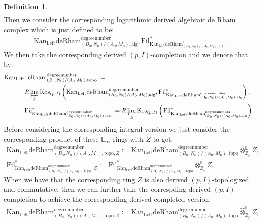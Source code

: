 \documentclass[11pt]{book}
\theoremstyle{definition}
\newtheorem{definition}[theorem]{Definition}
\numberwithin{equation}{section}
\begin{document}
\begin{definition}
\begin{align}
\end{align}
Then we consider the corresponding logarithmic derived algebraic de Rham complex which is just defined to be:
\begin{align}
\mathrm{Kan}_\mathrm{Left}\mathrm{deRham}^\text{degreenumber}_{(B_0,N_0)/(A_0,M_0),\mathrm{alg}},\mathrm{Fil}^*_{\mathrm{Kan}_\mathrm{Left}\mathrm{deRham}^1_{(B_0,N_0)/(A_0,M_0),\mathrm{alg}}}.	
\end{align}
We then take the corresponding derived $(p,I)$-completion and we denote that by:
\begin{align}
\mathrm{Kan}_\mathrm{Left}&\mathrm{deRham}^\text{degreenumber}_{(B_0,N_0)/(A_0,M_0),\mathrm{topo}}:=\\
&R\varprojlim_k\mathrm{Kos}_{(p,I)}\left(\mathrm{Kan}_\mathrm{Left}\mathrm{deRham}^\text{degreenumber}_{(B_0,N_0)/(A_0,M_0),\mathrm{alg}},\mathrm{Fil}^*_{\mathrm{Kan}_\mathrm{Left}\mathrm{deRham}^\text{degreenumber}_{(B_0,N_0)/(A_0,M_0),\mathrm{alg}}}\right),\\
&\mathrm{Fil}^*_{\mathrm{Kan}_\mathrm{Left}\mathrm{deRham}^\text{degreenumber}_{(B_0,N_0)/(A_0,M_0),\mathrm{topo}}}:=R\varprojlim_k\mathrm{Kos}_{(p,I)}\left(\mathrm{Fil}^*_{\mathrm{Kan}_\mathrm{Left}\mathrm{deRham}^\text{degreenumber}_{(B_0,N_0)/(A_0,M_0),\mathrm{alg}}}\right).	
\end{align}
Before considering the corresponding integral version we just consider the corresponding product of these $\mathbb{E}_\infty$-rings with $Z$ to get:
\begin{align}
\mathrm{Kan}_\mathrm{Left}\mathrm{deRham}^\text{degreenumber}_{(B_0,N_0)/(A_0,M_0),\mathrm{topo},Z}:=\mathrm{Kan}_\mathrm{Left}\mathrm{deRham}^\text{degreenumber}_{(B_0,N_0)/(A_0,M_0),\mathrm{topo}}{\otimes}^\mathbb{L}_{\mathbb{Z}_p}Z,\\
\mathrm{Fil}^*_{\mathrm{Kan}_\mathrm{Left}\mathrm{deRham}^\text{degreenumber}_{(B_0,N_0)/(A_0,M_0),\mathrm{topo}},Z}:=\mathrm{Fil}^*_{\mathrm{Kan}_\mathrm{Left}\mathrm{deRham}^\text{degreenumber}_{(B_0,N_0)/(A_0,M_0),\mathrm{topo}}}{\otimes}^\mathbb{L}_{\mathbb{Z}_p}Z.	
\end{align}
When we have that the corresponding ring $Z$ is also derived $(p,I)$-topologized and commutative, then we can further take the correspding derived $(p,I)$-completion to achieve the corresponding derived completed version:
\begin{align}
\mathrm{Kan}_\mathrm{Left}\mathrm{deRham}^\text{degreenumber}_{(B_0,N_0)/(A_0,M_0),\mathrm{topo},Z}:=\mathrm{Kan}_\mathrm{Left}\mathrm{deRham}^\text{degreenumber}_{(B_0,N_0)/(A_0,M_0),\mathrm{topo}}\widehat{\otimes}^\mathbb{L}_{\mathbb{Z}_p}Z,\\

\end{align}
\end{definition}
\end{document}
